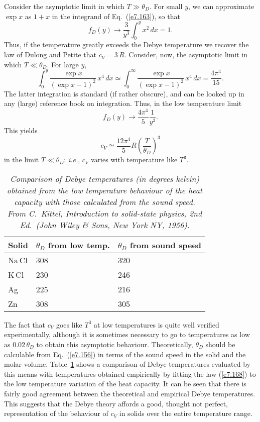 Consider the asymptotic limit in which $T\gg \theta_D$. For small $y$, we can approximate
$\exp x$ as $1+x$ in the integrand of Eq.~(\ref{e7.163}), so that
\begin{equation}
f_D(y) \rightarrow \frac{3}{y^3} \int_0^y x^2\,dx = 1.
\end{equation}
Thus, if the temperature greatly exceeds the Debye temperature we recover the law of
Dulong and Petite that $c_V = 3\,R$. Consider, now, the 
asymptotic limit in which $T\ll \theta_D$. For large $y$,
\begin{equation}
\int_0^y \frac{\exp x}{(\exp x -1)^2}\,x^4 \, dx \simeq
\int_0^\infty \frac{\exp x}{(\exp x -1)^2}\,x^4 \, dx = \frac{4\pi^4}{15}.
\end{equation}
The latter integration is standard (if rather obscure), and can be looked up in any 
(large) reference book
on integration. Thus, in the low temperature limit
\begin{equation}
f_D(y) \rightarrow \frac{4\pi^4}{5} \frac{1}{y^3}.
\end{equation}
This yields
\begin{equation}
c_V \simeq \frac{12 \pi^4}{5} R \left(\frac{T}{\theta_D}\right)^3\label{e7.168}
\end{equation}
in the limit $T\ll \theta_D$: {\em i.e.}, $c_V$ varies with temperature like $T^3$. 

\begin{table}[ht]
\centering
\begin{tabular}{lll}
Solid & $\theta_D$ from low temp. & $\theta_D$ from sound speed \nonumber\\[0.5ex] \hline
Na\,Cl & 308 & 320 \\
K\,Cl & 230 & 246 \\
Ag & 225 & 216 \\
Zn & 308 & 305\\
\end{tabular}
\caption{\em Comparison of Debye temperatures (in degrees kelvin) obtained from the
low temperature behaviour of the heat capacity with those calculated from the 
sound speed. From C.~Kittel, Introduction to solid-state physics, 2nd Ed.\ (John Wiley \& Sons, New York NY, 1956).}\label{t4}
\end{table}

The fact that $c_V$ goes like $T^3$ at low temperatures is quite well verified experimentally,
although it is sometimes necessary to go to temperatures as low as $0.02 \,\theta_D$ to obtain
this asymptotic behaviour. Theoretically, $\theta_D$ should be calculable from 
Eq.~(\ref{e7.156})
in terms of the sound speed in the solid and the molar volume. Table~\ref{t4} shows a
comparison of Debye temperatures evaluated by this means with temperatures obtained 
empirically by fitting the law (\ref{e7.168}) to the low temperature variation of the
heat capacity. It can be seen that there is fairly good agreement between the theoretical and
empirical Debye temperatures. This suggests that the Debye theory affords a good, thought not
perfect, representation of the behaviour of $c_V$ in solids over the entire temperature range.

